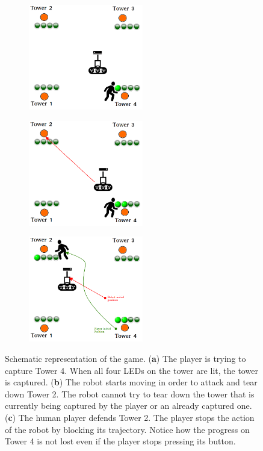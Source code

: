 {\begin{figure}[H]
	\centering
	\begin{subfigure}[b]{0.4\textwidth}
		\includegraphics[width=5cm]{images/05-modeling/situation1}
   \caption{}
		\label{situation1} 
	\end{subfigure}
  \hspace{1cm}
	\begin{subfigure}[b]{0.4\textwidth}
		\includegraphics[width=5cm]{images/05-modeling/situation2}
		\caption{}
		\label{situation2}
	\end{subfigure}
	\begin{subfigure}[b]{0.4\textwidth}
		\includegraphics[width=5cm]{images/05-modeling/situation3}
		\caption{} 
		\label{situation3}
	\end{subfigure}
	\caption{Schematic representation of the game. (\textbf{a}) The player is trying to capture Tower 4. When all four LEDs on the tower are lit, the tower is captured. (\textbf{b}) The robot starts moving in order to attack and tear down Tower 2. The robot cannot try to tear down the tower that is currently being captured by the player or an already captured one. (\textbf{c}) The human player defends Tower 2. The player stops the action of the robot by blocking its trajectory. Notice how the progress on Tower 4 is not lost even if the player stops pressing its button.} 
  \label{figure:overallgame}
\end{figure}

}
